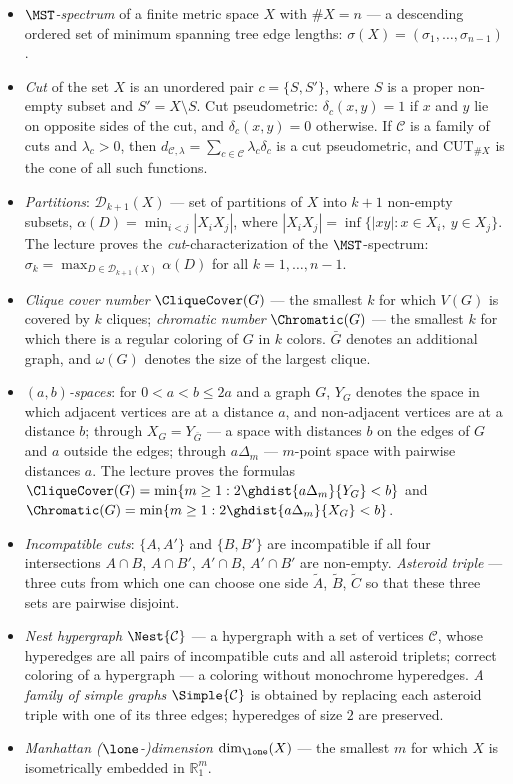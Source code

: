 \documentclass[a4paper,12pt]{report}
\begin{document}
\begin{itemize}[leftmargin=*]
\item \emph{$\MST$-spectrum} of a finite metric space $X$ with $\#X=n$ --- a descending ordered set of minimum spanning tree edge lengths\textup{:} $\sigma(X)=(\sigma_1,\dots,\sigma_{n-1})$.
\item \emph{Cut} of the set $X$ is an unordered pair $c=\{S,S'\}$, where $S$ is a proper non-empty subset and $S'=X\setminus S$. Cut pseudometric\textup{:} $\delta_c(x,y)=1$ if $x$ and $y$ lie on opposite sides of the cut, and $\delta_c(x,y)=0$ otherwise. If $\mathcal C$ is a family of cuts and $\lambda_c>0$, then $d_{\mathcal C,\lambda}=\sum_{c\in\mathcal C}\lambda_c\delta_c$ is a cut pseudometric, and $\mathrm{CUT}_{\#X}$ is the cone of all such functions.
\item \emph{Partitions}: $\mathcal D_{k+1}(X)$ --- set of partitions of $X$ into $k+1$ non-empty subsets, $\alpha(D)=\min_{i<j}|X_iX_j|$, where $|X_iX_j|=\inf\{|xy|:x\in X_i,\ y\in X_j\}$. The lecture proves the \emph{cut}-characterization of the $\MST$-spectrum\textup{:} $\sigma_k=\max_{D\in\mathcal D_{k+1}(X)}\alpha(D)$ for all $k=1,\dots,n-1$.
\item \emph{Clique cover number} $\CliqueCover(G)$ --- the smallest $k$ for which $V(G)$ is covered by $k$ cliques\textup{;} \emph{chromatic number} $\Chromatic(G)$ --- the smallest $k$ for which there is a regular coloring of $G$ in $k$ colors. $\bar G$ denotes an additional graph, and $\omega(G)$ denotes the size of the largest clique.
\item \emph{$(a,b)$-spaces}: for $0<a<b\le2a$ and a graph $G$, $Y_G$ denotes the space in which adjacent vertices are at a distance $a$, and non-adjacent vertices are at a distance $b$; through $X_G=Y_{\bar G}$ --- a space with distances $b$ on the edges of $G$ and $a$ outside the edges; through $a\Delta_m$ --- $m$-point space with pairwise distances $a$. The lecture proves the formulas $\CliqueCover(G)=\min\{m\ge1:2\ghdist{a\Delta_m}{Y_G}<b\}$ and $\Chromatic(G)=\min\{m\ge1:2\ghdist{a\Delta_m}{X_G}<b\}$.
\item \emph{Incompatible cuts}: $\{A,A'\}$ and $\{B,B'\}$ are incompatible if all four intersections $A\cap B$, $A\cap B'$, $A'\cap B$, $A'\cap B'$ are non-empty. \emph{Asteroid triple} --- three cuts from which one can choose one side $\widetilde A$, $\widetilde B$, $\widetilde C$ so that these three sets are pairwise disjoint.
\item \emph{Nest hypergraph} $\Nest{\mathcal C}$ --- a hypergraph with a set of vertices $\mathcal C$, whose hyperedges are all pairs of incompatible cuts and all asteroid triplets\textup{;} correct coloring of a hypergraph --- a coloring without monochrome hyperedges. \emph{A family of simple graphs} $\Simple{\mathcal C}$ is obtained by replacing each asteroid triple with one of its three edges; hyperedges of size $2$ are preserved.
\item \emph{Manhattan \textup{(}$\lone$-\textup{)}dimension} $\dim_{\lone}(X)$ --- the smallest $m$ for which $X$ is isometrically embedded in $\mathbb R^m_1$.
\end{itemize}
\end{document}
